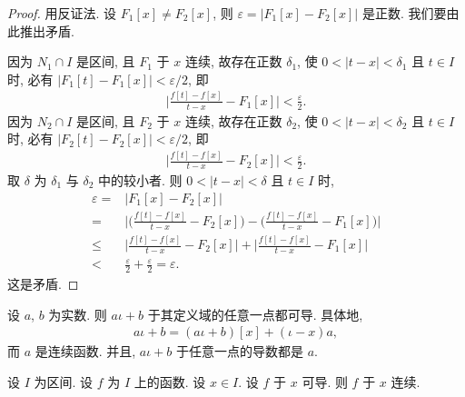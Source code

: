 \begin{proof}
    用反证法. 设 $F_1 [x] \neq F_2 [x]$, 则 $\varepsilon = |F_1 [x] - F_2 [x]|$ 是正数. 我们要由此推出矛盾.

    因为 $N_1 \cap I$ 是区间, 且 $F_1$ 于 $x$ 连续, 故存在正数 $\delta_1$, 使 $0 < |t - x| < \delta_1$ 且 $t \in I$ 时, 必有 $|F_1 [t] - F_1 [x]| < {\varepsilon}/{2}$, 即
    \begin{align*}
        \Bigg| \frac{f[t] - f[x]}{t - x} - F_1 [x] \Bigg| < \frac{\varepsilon}{2}.
    \end{align*}
    因为 $N_2 \cap I$ 是区间, 且 $F_2$ 于 $x$ 连续, 故存在正数 $\delta_2$, 使 $0 < |t - x| < \delta_2$ 且 $t \in I$ 时, 必有 $|F_2 [t] - F_2 [x]| < {\varepsilon}/{2}$, 即
    \begin{align*}
        \Bigg| \frac{f[t] - f[x]}{t - x} - F_2 [x] \Bigg| < \frac{\varepsilon}{2}.
    \end{align*}
    取 $\delta$ 为 $\delta_1$ 与 $\delta_2$ 中的较小者. 则 $0 < |t - x| < \delta$ 且 $t \in I$ 时,
    \begin{align*}
        \varepsilon
        = {}    & |F_1 [x] - F_2 [x]|                                                                                                 \\
        = {}    & \Bigg| \Bigg( \frac{f[t] - f[x]}{t - x} - F_2 [x] \Bigg) - \Bigg( \frac{f[t] - f[x]}{t - x} - F_1 [x] \Bigg) \Bigg| \\
        \leq {} & \Bigg| \frac{f[t] - f[x]}{t - x} - F_2 [x] \Bigg| + \Bigg| \frac{f[t] - f[x]}{t - x} - F_1 [x] \Bigg|               \\
        < {}    & \frac{\varepsilon}{2} + \frac{\varepsilon}{2} = \varepsilon.
    \end{align*}
    这是矛盾.
\end{proof}

\begin{example}
    设 $a$, $b$ 为实数. 则 $a\iota + b$ 于其定义域的任意一点都可导. 具体地,
    \begin{align*}
        a\iota + b = (a\iota + b)[x] + (\iota - x)a,
    \end{align*}
    而 $a$ 是连续函数. 并且, $a\iota + b$ 于任意一点的导数都是 $a$.
\end{example}

\begin{theorem}
    设 $I$ 为区间. 设 $f$ 为 $I$ 上的函数. 设 $x \in I$. 设 $f$ 于 $x$ 可导. 则 $f$ 于 $x$ 连续.
\end{theorem}

